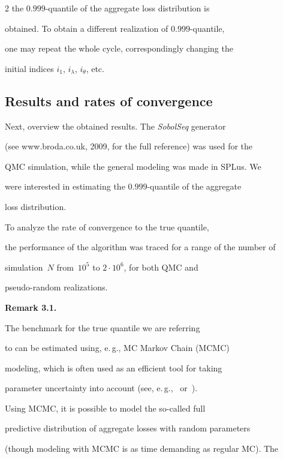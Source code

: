 \begin{multicols}{2}
the $0.999$-quantile of the aggregate loss distribution is

obtained. To obtain a different realization of $0.999$-quantile,

one may repeat the whole cycle, correspondingly changing the

initial indices $i_1$, $i_\lambda$, $i_\theta$, etc.



\subsection{Results and rates of convergence}



\noindent

Next, overview the obtained results. The {\it SobolSeq} generator

(see {\sf www.broda.co.uk}, 2009, for the full reference) was used for the

QMC simulation, while the general modeling was made in SPLus. We

were interested in estimating the $0.999$-quantile of the aggregate

loss distribution.



To analyze the rate of convergence to the true quantile,

the performance of the algorithm was traced for a range of the number of

simulation~$N$ from~$10^5$ to $2\cdot10^6$, for both QMC and

pseudo-random realizations.



\medskip



\noindent

\textbf{Remark 3.1.}\

The benchmark for the true quantile we are referring

to can be estimated using, e.\,g., MC Markov Chain (MCMC)

modeling, which is often used as an efficient tool for taking

parameter uncertainty into account (see, e.\,g.,~\cite{Shev4} or~\cite{Shev5}).

Using MCMC, it is possible to model the so-called full

predictive distribution of aggregate losses with random parameters

(though modeling with MCMC is as time demanding as regular MC). The


\end{multicols}
